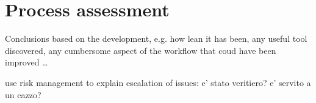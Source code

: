 \section{Process assessment}\label{sec:concl_proc}

Conclusions based on the development, e.g. how lean it has been, any useful tool discovered, any cumbersome aspect of the workflow that coud have been improved \dots

use risk management to explain escalation of issues:
e' stato veritiero?
e' servito a un cazzo?
